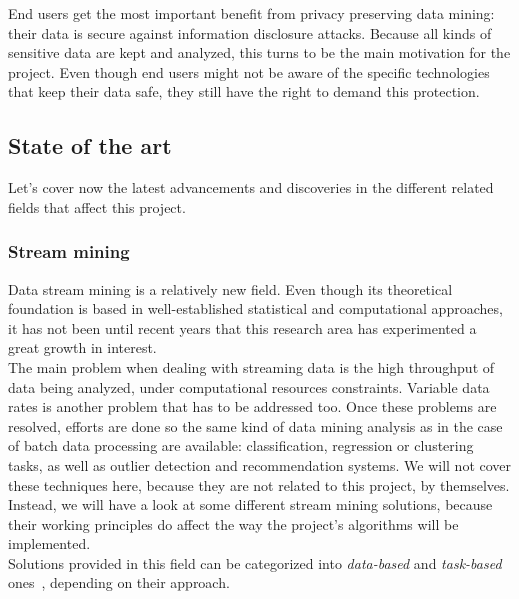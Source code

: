 End users get the most important benefit from privacy preserving data mining: their data is secure against information disclosure attacks. Because all kinds of sensitive data are kept and analyzed, this turns to be the main motivation for the project. Even though end users might not be aware of the specific technologies that keep their data safe, they still have the right to demand this protection.

\subsection{State of the art}
\label{section:state-of-the-art}

Let’s cover now the latest advancements and discoveries in the different related fields that affect this project.

\subsubsection{Stream mining}

Data stream mining is a relatively new field. Even though its theoretical foundation is based in well-established statistical and computational approaches, it has not been until recent years that this research area has experimented a great growth in interest.\\

The main problem when dealing with streaming data is the high throughput of data being analyzed, under computational resources constraints. Variable data rates is another problem that has to be addressed too. Once these problems are resolved, efforts are done so the same kind of data mining analysis as in the case of batch data processing are available: classification, regression or clustering tasks, as well as outlier detection and recommendation systems. We will not cover these techniques here, because they are not related to this project, by themselves. Instead, we will have a look at some different stream mining solutions, because their working principles do affect the way the project’s algorithms will be implemented.\\

Solutions provided in this field can be categorized into \textit{data-based} and \textit{task-based} ones~\cite{miningDataStreams}, depending on their approach.

